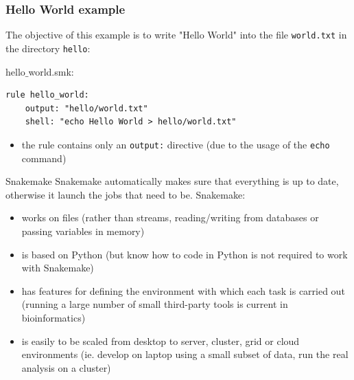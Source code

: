 \begin{frame}[containsverbatim]
\frametitle{Hello World example}
The objective of this example is to write "Hello World" into the file \verb|world.txt| in the directory \verb|hello|:
\begin{block}{hello$\_$world.smk:}
\begin{lstlisting}
rule hello_world:
    output: "hello/world.txt"
    shell: "echo Hello World > hello/world.txt"
\end{lstlisting}
\end{block}
\begin{itemize}
    \item the rule contains only an \verb|output:| directive (due to the usage of the \verb|echo| command)
\end{itemize}
\end{frame}
\begin{frame}{Snakemake}
Snakemake automatically makes sure that everything is up to date, otherwise it launch the jobs that need to be.
\vfill
Snakemake:
\begin{itemize}
    \item works on files (rather than streams, reading/writing from databases or passing variables in memory)
    \item is based on Python (but know how to code in Python is not required to work with Snakemake)
    \item has features for defining the environment with which each task is carried out (running a large number of small third-party tools is current in bioinformatics)
    \item is easily to be scaled from desktop to server, cluster, grid or cloud environments (ie. develop on laptop using a small subset of data, run the real analysis on a cluster)
\end{itemize}    
\end{frame}
